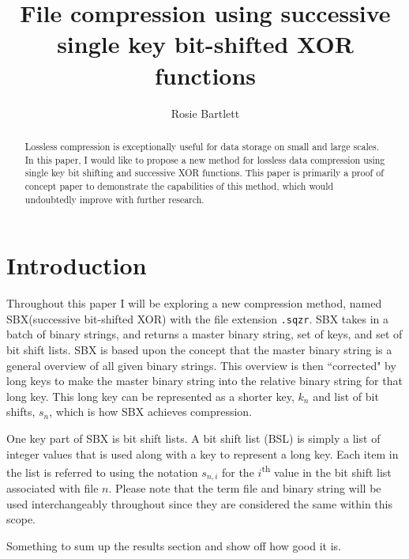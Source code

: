 \documentclass[10pt]{article}
\begin{document}
\begin{opening}

\title{File compression using successive single key bit-shifted XOR functions}

\author{Rosie Bartlett}

\begin{abstract}
Lossless compression is exceptionally useful for data storage on small and large scales. In this paper, I would like to propose a new method for lossless data compression using single key bit shifting and successive XOR functions. This paper is primarily a proof of concept paper to demonstrate the capabilities of this method, which would undoubtedly improve with further research.

\end{abstract}


\end{opening}


\section{Introduction}\label{sec:intro}

Throughout this paper I will be exploring a new compression method, named SBX(successive bit-shifted XOR) with the file extension \texttt{.sqzr}. SBX takes in a batch of binary strings, and returns a master binary string, set of keys, and set of bit shift lists. SBX is based upon the concept that the master binary string is a general overview of all given binary strings. This overview is then “corrected" by long keys to make the master binary string into the relative binary string for that long key. This long key can be represented as a shorter key, $k_n$ and list of bit shifts, $s_n$, which is how SBX achieves compression.

One key part of SBX is bit shift lists. A bit shift list (BSL) is simply a list of integer values that is used along with a key to represent a long key. Each item in the list is referred to using the notation $s_{n,i}$ for the $i$\textsuperscript{th} value in the bit shift list associated with file $n$. Please note that the term file and binary string will be used interchangeably throughout since they are considered the same within this scope.

Something to sum up the results section and show off how good it is.
\end{document}
